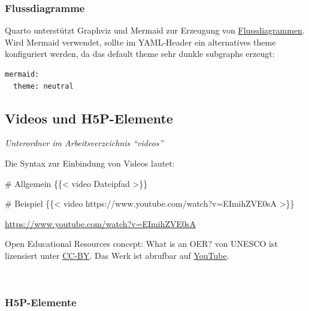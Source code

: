 \documentclass[
  letterpaper,
  DIV=11]{scrartcl}
\newenvironment{Shaded}{\begin{snugshade}}{\end{snugshade}}
\newcommand{\NormalTok}[1]{\textcolor[rgb]{0.00,0.23,0.31}{#1}}
\providecommand{\tightlist}{%
  \setlength{\itemsep}{0pt}\setlength{\parskip}{0pt}}\usepackage{longtable,booktabs,array}
\begin{document}
\subsubsection{Flussdiagramme}\label{flussdiagramme}

Quarto unterstützt Graphviz und Mermaid zur Erzeugung von
\href{https://quarto.org/docs/authoring/markdown-basics.html\#diagrams}{Flussdiagrammen}.
Wird Mermaid verwendet, sollte im YAML-Header ein alternatives theme
konfiguriert werden, da das default theme sehr dunkle subgraphs erzeugt:

\begin{verbatim}
mermaid: 
  theme: neutral 
\end{verbatim}

\subsection{Videos und H5P-Elemente}\label{videos-und-h5p-elemente}

\begin{description}
\tightlist
\item[Speicherort von Videos]
\emph{Unterordner im Arbeitsverzeichnis ``videos''}
\end{description}

Die Syntax zur Einbindung von Videos lautet:

\begin{Shaded}
\begin{Highlighting}[]
\NormalTok{\# Allgemein}
\NormalTok{\{\{\textless{} video Dateipfad \textgreater{}\}\}}

\NormalTok{\# Beispiel}
\NormalTok{\{\{\textless{} video https://www.youtube.com/watch?v=EImihZVE0sA \textgreater{}\}\}}
\end{Highlighting}
\end{Shaded}

\url{https://www.youtube.com/watch?v=EImihZVE0sA}

Open Educational Resources concept: What is an OER? von UNESCO ist
lizensiert unter
\href{https://creativecommons.org/licenses/by/4.0/}{CC-BY}. Das Werk ist
abrufbar auf
\href{https://www.youtube.com/watch?v=EImihZVE0sA}{YouTube}.

~

\subsubsection*{H5P-Elemente}\label{h5p-elemente}
\end{document}
